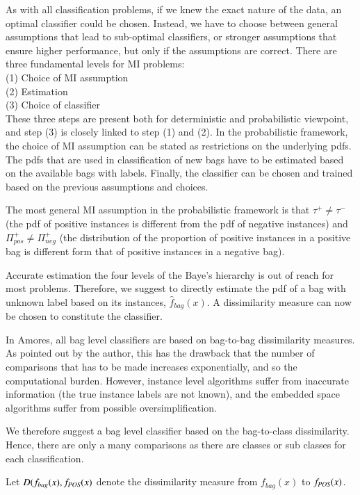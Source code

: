 As with all classification problems, if we knew the exact nature of the data, an optimal classifier could be chosen. 
Instead, we have to choose between general assumptions that lead to sub-optimal classifiers, or stronger assumptions that ensure higher performance, but only if the assumptions are correct. 
There are three fundamental levels for MI problems: \\
(1) Choice of MI assumption \\
(2) Estimation \\
(3) Choice of classifier \\
These three steps are present both for deterministic and probabilistic viewpoint, and step (3) is closely linked to step (1) and (2). 
In the probabilistic framework, the choice of MI assumption can be stated as restrictions on the underlying pdfs. 
The pdfs that are used in classification of new bags have to be estimated based on the available bags with labels. 
Finally, the classifier can be chosen and trained based on the previous assumptions and choices. 

The most general MI assumption in the probabilistic framework is that $\tau^+ \neq \tau^-$ (the pdf of positive instances is different from the pdf of negative instances) and $\Pi_{pos}^+ \neq \Pi_{neg}^+$ (the distribution of the proportion of positive instances in a positive bag is different form that of positive instances in a negative bag). 

Accurate estimation the four levels of the Baye's hierarchy is out of reach for most problems. 
Therefore, we suggest to directly estimate the pdf of a bag with unknown label based on its instances, $\hat{f}_{bag}(x)$.
A dissimilarity measure can now be chosen to constitute the classifier. 

In Amores, all bag level classifiers are based on bag-to-bag dissimilarity measures. 
As pointed out by the author, this has the drawback that the number of comparisons that has to be made increases exponentially, and so the computational burden.
However, instance level algorithms suffer from inaccurate information (the true instance labels are not known), and the embedded space algorithms suffer from possible oversimplification. 

We therefore suggest a bag level classifier based on the bag-to-class dissimilarity. 
Hence, there are only a many comparisons as there are classes or sub classes for each classification. 

Let $D(f_{bag}(x), f_{\text{\scriptsize{{\it POS}}}}(x)$ denote the dissimilarity measure from $f_{bag}(x)$ to $f_{\text{\scriptsize{{\it POS}}}}(x)$.

